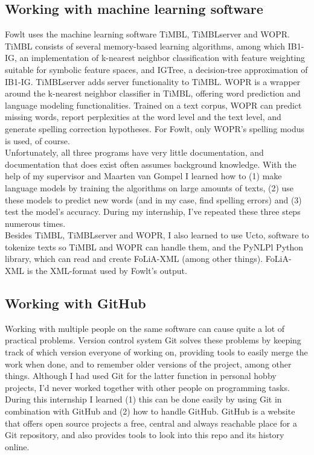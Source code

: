 \documentclass[12pt]{article}
\begin{document}
\subsection{Working with machine learning software}
Fowlt uses the machine learning software TiMBL, TiMBLserver and WOPR. TiMBL consists of several memory-based learning algorithms, among which IB1-IG, an implementation of k-nearest neighbor classification with feature weighting suitable for symbolic feature spaces, and IGTree, a decision-tree approximation of IB1-IG. TiMBLserver adds server functionality to TiMBL. WOPR is a wrapper around the k-nearest neighbor classifier in TiMBL, offering word prediction and language modeling functionalities. Trained on a text corpus, WOPR can predict missing words, report perplexities at the word level and the text level, and generate spelling correction hypotheses. For Fowlt, only WOPR's spelling modus is used, of course.
\\\indent
Unfortunately, all three programs have very little documentation, and documentation that does exist often assumes background knowledge. With the help of my supervisor and Maarten van Gompel I learned how to (1) make language models by training the algorithms on large amounts of texts, (2) use these models to predict new words (and in my case, find spelling errors) and (3) test the model's accuracy. During my internship, I've repeated these three steps numerous times.
\\\indent
Besides TiMBL, TiMBLserver and WOPR, I also learned to use Ucto, software to tokenize texts so TiMBL and WOPR can handle them, and the PyNLPl Python library, which can read and create FoLiA-XML (among other things). FoLiA-XML is the XML-format used by Fowlt's output.

\subsection{Working with GitHub}
Working with multiple people on the same software can cause quite a lot of practical problems. Version control system Git solves these problems by keeping track of which version everyone of working on, providing tools to easily merge the work when done, and to remember older versions of the project, among other things. Although I had used Git for the latter function in personal hobby projects, I'd never worked together with other people on programming tasks. During this internship I learned (1) this can be done easily by using Git in combination with GitHub and (2) how to handle GitHub. GitHub is a website that offers open source projects a free, central and always reachable place for a Git repository, and also provides tools to look into this repo and its history online.
\end{document}
